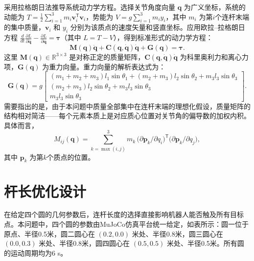 \documentclass{article}
\begin{document}
采用拉格朗日法推导系统动力学方程。选择关节角度向量 \(\boldsymbol{q}\) 为广义坐标，系统的动能为 \(T = \frac{1}{2}\sum_{i=1}^{3} m_i \boldsymbol{v}_i^{\mathsf{T}}\boldsymbol{v}_i\)，势能为 \(V = g\sum_{i=1}^{3} m_i y_i\)，其中 \(m_i\) 为第\(i\)个连杆末端的集中质量，\(\boldsymbol{v}_i\) 和 \(y_i\) 分别为该质点的速度矢量和竖直坐标。应用欧拉--拉格朗日方程 \(\frac{d}{dt}\frac{\partial L}{\partial \dot{\boldsymbol{q}}} - \frac{\partial L}{\partial \boldsymbol{q}} = \boldsymbol{\tau}\)（其中 \(L = T-V\)），得到标准形式的动力学方程：
\begin{equation}
\boldsymbol{M}(\boldsymbol{q})\ddot{\boldsymbol{q}} + \boldsymbol{C}(\boldsymbol{q}, \dot{\boldsymbol{q}})\dot{\boldsymbol{q}} + \boldsymbol{G}(\boldsymbol{q}) = \boldsymbol{\tau}.
\end{equation}
这里 \(\boldsymbol{M}(\boldsymbol{q})\in\mathbb{R}^{3\times 3}\) 是对称正定的质量矩阵，\(\boldsymbol{C}(\boldsymbol{q}, \dot{\boldsymbol{q}})\dot{\boldsymbol{q}}\) 为科里奥利力和离心力项，\(\boldsymbol{G}(\boldsymbol{q})\) 为重力向量。重力向量的解析表达式为：
\begin{equation}
\boldsymbol{G}(\boldsymbol{q}) = g \begin{bmatrix}
(m_1+m_2+m_3)l_1\sin\theta_1 + (m_2+m_3)l_2\sin\theta_2 + m_3 l_3\sin\theta_3 \\
(m_2+m_3)l_2\sin\theta_2 + m_3 l_3\sin\theta_3 \\
m_3 l_3\sin\theta_3
\end{bmatrix}.
\end{equation}
需要指出的是，由于本问题中质量全部集中在连杆末端的理想化假设，质量矩阵的结构相对简洁——每个元素本质上是对应质心位置对关节角的偏导数的加权内积。具体而言，
\begin{equation}
M_{ij}(\boldsymbol{q}) = \sum_{k=\max(i,j)}^{3} m_k\,
\bigl(\partial\boldsymbol{p}_k/\partial q_i\bigr)^{\mathsf{T}}
\bigl(\partial\boldsymbol{p}_k/\partial q_j\bigr),
\end{equation}
其中 \(\boldsymbol{p}_k\) 为第\(k\)个质点的位置。

\section{杆长优化设计}

在给定四个圆的几何参数后，连杆长度的选择直接影响机器人能否触及所有目标点。本问题中，四个圆的参数由MuJoCo仿真平台统一给定，如表所示：圆一位于原点、半径0.5米，圆二圆心在 \((0.2, 0.0)\) 米处、半径0.8米，圆三圆心在 \((0.0, 0.3)\) 米处、半径0.8米，圆四圆心在 \((0.5, 0.5)\) 米处、半径0.5米。所有圆的运动周期均为6 s。
\end{document}
